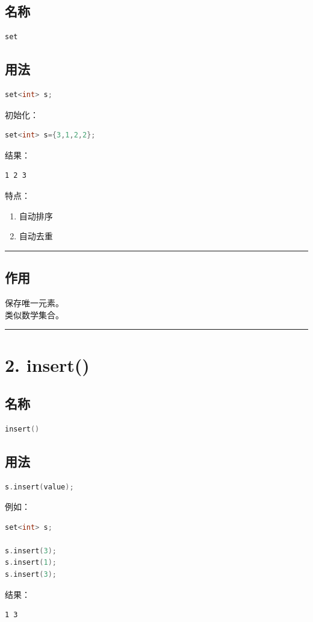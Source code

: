 \documentclass[9pt,twocolumn]{extarticle}
\begin{document}
\subsection{名称}
\begin{lstlisting}[language=C++]
set
\end{lstlisting}

\subsection{用法}
\begin{lstlisting}[language=C++]
set<int> s;
\end{lstlisting}
初始化：
\begin{lstlisting}[language=C++]
set<int> s={3,1,2,2};
\end{lstlisting}
结果：
\begin{lstlisting}
1 2 3
\end{lstlisting}

特点：
\begin{enumerate}
    \item 自动排序
    \item 自动去重
\end{enumerate}

\noindent\rule{\linewidth}{0.4pt}

\subsection{作用}
保存唯一元素。\\
类似数学集合。

\noindent\rule{\linewidth}{0.4pt}

\section{2. insert()}

\subsection{名称}
\begin{lstlisting}[language=C++]
insert()
\end{lstlisting}

\subsection{用法}
\begin{lstlisting}[language=C++]
s.insert(value);
\end{lstlisting}
例如：
\begin{lstlisting}[language=C++]
set<int> s;

s.insert(3);
s.insert(1);
s.insert(3);
\end{lstlisting}
结果：
\begin{lstlisting}
1 3
\end{lstlisting}
\end{document}
